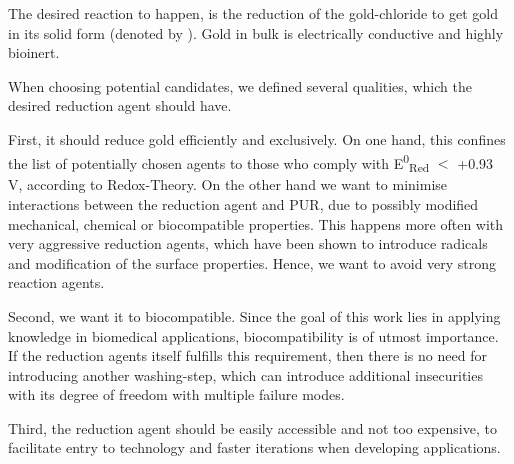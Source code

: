 The desired reaction to happen, is the reduction of the gold-chloride to get gold in its solid form (denoted by ). Gold in bulk is electrically conductive and highly bioinert.

When choosing potential candidates, we defined several qualities, which the desired reduction agent should have.

First, it should reduce gold efficiently and exclusively. On one hand, this confines the list of potentially chosen agents to those who comply with E\textsuperscript{0}\textsubscript{Red} $\mathrm{<}$ +0.93 V, according to Redox-Theory. On the other hand we want to minimise interactions between the reduction agent and PUR, due to possibly modified mechanical, chemical or biocompatible properties. This happens more often with very aggressive reduction agents, which have been shown to introduce radicals and modification of the surface properties. Hence, we want to avoid very strong reaction agents. 

Second, we want it to biocompatible. Since the goal of this work lies in applying knowledge in biomedical applications, biocompatibility is of utmost importance. If the reduction agents itself fulfills this requirement, then there is no need for introducing another washing-step, which can introduce additional insecurities with its degree of freedom with multiple failure modes.


Third, the reduction agent should be easily accessible and not too expensive, to facilitate entry to technology and faster iterations when developing applications.



